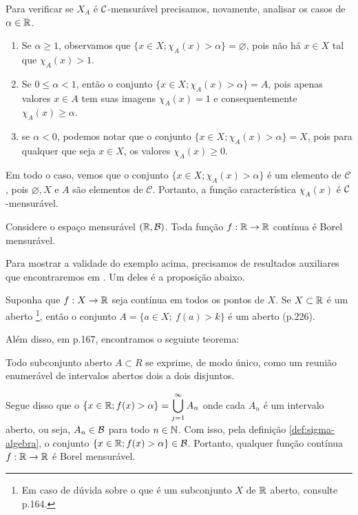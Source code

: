 Para verificar se $X_A$ é $\operatorname{\mathcal{C}}$-mensurável precisamos, novamente, analisar os casos de $\alpha \in \mathbb{R}$.
	\begin{enumerate}[label*= (\Roman*)]
		\item Se $\alpha \geq 1$, observamos que $\{x \in X; \chi_A(x)>  \alpha\} = \varnothing$, pois não há $x \in X$ tal que $\chi_A(x) > 1$.  
		\item Se $ 0 \leq \alpha < 1$, então o conjunto $\{x \in X; \chi_A(x)>  \alpha\} = A$, pois apenas valores $x \in A$ tem suas imagens $\chi_A(x) = 1$ e consequentemente $\chi_A(x) \geq \alpha$.
		\item  se $\alpha < 0$, podemos notar que o conjunto $\{x \in X; \chi_A(x)>  \alpha\} = X$, pois para qualquer que seja $x \in X$, os valores $\chi_A(x) \geq 0$.
	\end{enumerate}
Em todo o caso, vemos que o conjunto $\{x \in X; \chi_A(x)>  \alpha\}$ é um elemento de $\mathcal{C}$, pois $\varnothing, X$ e $A$ são elementos de $\mathcal{C}$. Portanto, a função característica $\chi_A(x)$ é $\operatorname{\mathcal{C}}$-mensurável.
\begin{example}
\label{ex:função-continua-mensuravel}
    Considere o espaço mensurável $(\mathbb{R}, \operatorname{\mathcal{B}})$. Toda função $f: \mathbb{R} \to \mathbb{R}$ contínua é Borel mensurável.
\end{example}
	Para mostrar a validade do exemplo acima, precisamos de resultados auxiliares que encontraremos em \cite{elon}.
	Um deles é a proposição abaixo.
\begin{proposition}
\label{cit:função-continua-mensuravel}
	Suponha que $f:X \to \mathbb{R}$ seja contínua em todos os pontos de $X$.
	Se $X \subset \mathbb{R}$ é um aberto
	\footnote{Em caso de dúvida sobre o que é um subconjunto $X$ de $\mathbb{R}$ aberto, consulte \supercite{elon}{p.164}.}, então o conjunto $A = \{a \in X;\ f(a)>k\}$ é um aberto (p.226).
\end{proposition}

	Além disso, em \supercite{elon}{p.167}, encontramos o seguinte teorema:
	
	\begin{theorem}
		\label{teo:estrutura-abertos-reta}
		Todo subconjunto aberto $A \subset R$ se exprime, de modo único, como um reunião enumerável de intervalos abertos dois a dois disjuntos.
	\end{theorem}
	
	Segue disso que o
	$\{x \in \mathbb{R}; f(x) > \alpha\} = \displaystyle \bigcup_{j = 1}^\infty A_n$ onde cada $A_n$ é um intervalo aberto, ou seja, $A_n \in \operatorname{\mathcal{B}}$ para todo $n \in \operatorname{\mathbb{N}}$.
	Com isso, pela definição \ref{def:sigma-algebra}, o conjunto $\{x \in \mathbb{R}; f(x) > \alpha\} \in \operatorname{\mathcal{B}}$.
	Portanto, qualquer função contínua $f: \mathbb{R} \to \mathbb{R}$ é Borel mensurável.


